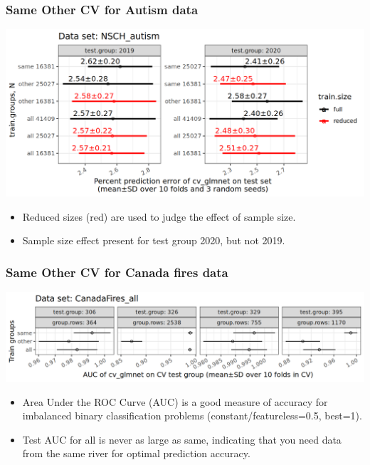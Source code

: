 \documentclass{beamer}
\begin{document}
\begin{frame}
  \frametitle{Same Other CV for Autism data}
  \includegraphics[width=\textwidth]{NSCH_autism_error_glmnet_sizes_mean_sd_more.png}
  \begin{itemize}
  \item Reduced sizes (red) are used to judge the effect of sample size.
  \item Sample size effect present for test group 2020, but not 2019.
  \end{itemize}
\end{frame}

\begin{frame}
  \frametitle{Same Other CV for Canada fires data}
  \includegraphics[width=\textwidth]{CanadaFires_all_AUC_glmnet_mean_SD.png}
  \begin{itemize}
  \item Area Under the ROC Curve (AUC) is a good measure of accuracy
    for imbalanced binary classification problems (constant/featureless=0.5, best=1).
  \item Test AUC for all is never as large as same, indicating that
    you need data from the same river for optimal prediction accuracy.
  \end{itemize}
\end{frame}
\end{document}
